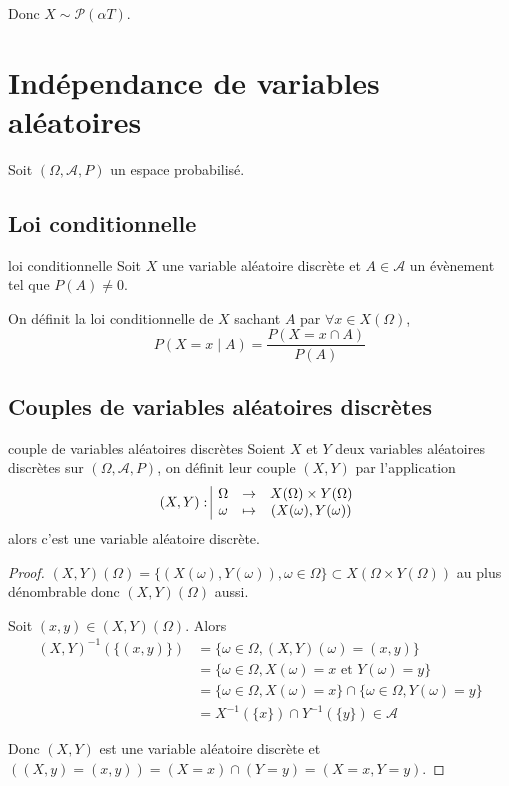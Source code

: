 Donc $X \sim \mathcal P(\alpha T)$. 

\section{Indépendance de variables aléatoires }

Soit $(\Omega, \mathcal A, P)$ un espace probabilisé.

\subsection{Loi conditionnelle}

\begin{definition}{loi conditionnelle}{}
    Soit $X$ une variable aléatoire discrète et $A \in \mathcal A$ un évènement tel que $P(A) \neq 0$.

    On définit la loi conditionnelle de $X$ sachant $A$ par $\forall x \in X(\Omega)$,
    $$ P(X = x \mid A) = \frac{P(X = x \cap A)}{P(A)}$$
\end{definition}

\subsection{Couples de variables aléatoires discrètes }

\begin{theoreme}{couple de variables aléatoires discrètes}{}
    Soient $X$ et $Y$ deux variables aléatoires discrètes sur $(\Omega, \mathcal A, P)$, on définit 
    leur couple $(X, Y)$ par l'application 
    $$(X, Y): \space \begin{array}{|ccc} \displaystyle \Omega & \to & \displaystyle X(\Omega) \times Y(\Omega) \\ \displaystyle \omega & \mapsto & \displaystyle (X(\omega), Y(\omega)) \end{array}$$
    alors c'est une variable aléatoire discrète.
\end{theoreme}

\begin{proof}
    $(X, Y)(\Omega) = \{(X(\omega), Y(\omega)), \omega \in \Omega \} \subset X(\Omega \times Y(\Omega))$ au plus dénombrable 
    donc $(X, Y)(\Omega)$ aussi. 

    Soit $(x, y) \in (X, Y)(\Omega)$. Alors 
    \begin{align}
        (X, Y)^{-1}(\{(x, y)\}) & = \{\omega \in \Omega, (X, Y)(\omega) = (x, y)\} \\
        & = \{\omega \in \Omega, X(\omega) = x \text{ et } Y(\omega) = y\} \\
        & = \{\omega \in \Omega, X(\omega) = x\} \cap \{\omega \in \Omega, Y(\omega) = y\} \\
        & = X^{-1}(\{x\}) \cap Y^{-1}(\{y\}) \in \mathcal A
    \end{align} 

    Donc $(X, Y)$ est une variable aléatoire discrète et $((X, y) = (x, y)) = (X = x) \cap (Y = y) = (X = x, Y = y)$.
\end{proof}

